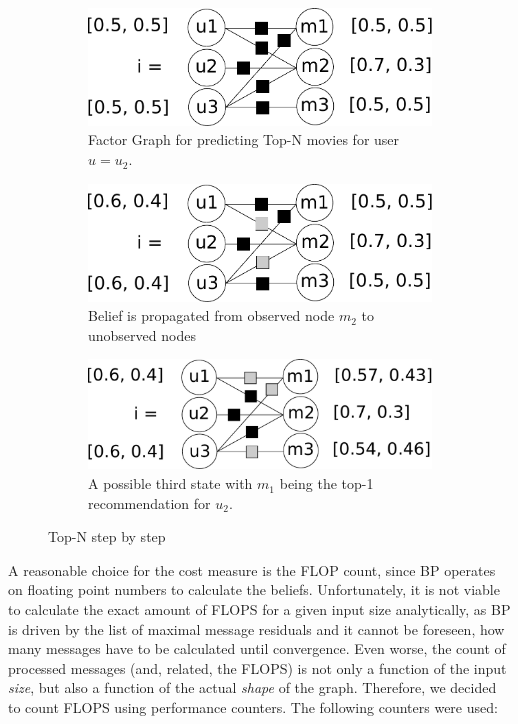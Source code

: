 \begin{figure}
	\centering
	\begin{subfigure}{.6\columnwidth}
	   \includegraphics[scale=0.3]{graphics/top-n-graph.pdf}%
	      \caption{Factor Graph for predicting Top-N movies for user $\hat u = u_2$.
	      \label{top_n_graph}
	   }
	\end{subfigure}\hfill%
	\begin{subfigure}{.6\columnwidth}
	   \includegraphics[scale=0.3]{graphics/top-n-important-messages.pdf}%
      	   \caption{Belief is propagated from observed node $m_2$ to unobserved nodes 
	      \label{top_n_graph_important_msg}
	   }
	\end{subfigure}\hfill%
	\begin{subfigure}{.6\columnwidth}
	   \includegraphics[scale=0.3]{graphics/top-n-final.pdf}%
	      \caption{A possible third state with $m_1$ being the top-1 recommendation for $u_2$. 
	      \label{top_n_graph_final_state}
	   }
	\end{subfigure}
	\caption{Top-N step by step}
\end{figure}

A reasonable choice for the cost measure is the FLOP count, since BP operates on floating point numbers to calculate the beliefs. Unfortunately, it is not viable to calculate the exact amount of FLOPS for a given input size analytically, as BP is driven by the list of maximal message residuals and it cannot be foreseen, how many messages have to be calculated until convergence. Even worse, the count of processed messages (and, related, the FLOPS) is not only a function of the input \textit{size}, but also a function of the actual \textit{shape} of the graph. Therefore, we decided to count FLOPS using performance counters. The following counters were used:

